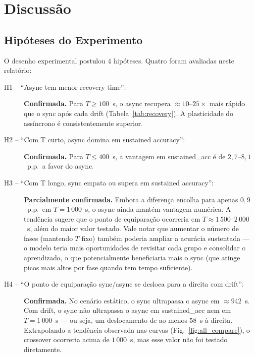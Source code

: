 \documentclass[12pt, a4paper]{article}
\begin{document}
\section{Discussão}

\subsection{Hipóteses do Experimento}

O desenho experimental postulou 4 hipóteses. Quatro foram avaliadas neste
relatório:

\begin{description}
    \item[H1 -- ``Async tem menor recovery time'':] \textbf{Confirmada.}
    Para $T \geq 100$~s, o async recupera $\approx 10$--$25{\times}$ mais
    rápido que o sync após cada drift (Tabela~\ref{tab:recovery}). A
    plasticidade do assíncrono é consistentemente superior.

    \item[H2 -- ``Com T curto, async domina em sustained accuracy'':]
    \textbf{Confirmada.} Para $T \leq 400$~s, a vantagem em sustained\_acc é
    de $2{,}7$--$8{,}1$~p.p.\ a favor do async.

    \item[H3 -- ``Com T longo, sync empata ou supera em sustained accuracy'':]
    \textbf{Parcialmente confirmada.} Embora a diferença encolha para apenas
    $0{,}9$~p.p.\ em $T = 1\,000$~s, o async ainda mantém vantagem numérica.
    A tendência sugere que o ponto de equiparação ocorreria em $T \approx
    1\,500$--$2\,000$~s, além do maior valor testado. Vale notar que aumentar
    o número de fases (mantendo $T$ fixo) também poderia ampliar a acurácia
    sustentada --- o modelo teria mais oportunidades de revisitar cada grupo e
    consolidar o aprendizado, o que potencialmente beneficiaria mais o sync
    (que atinge picos mais altos por fase quando tem tempo suficiente).

    \item[H4 -- ``O ponto de equiparação sync/async se desloca para a direita
    com drift'':] \textbf{Confirmada.} No cenário estático, o sync ultrapassa
    o async em $\approx 942$~s. Com drift, o sync não ultrapassa o async em
    sustained\_acc nem em $T = 1\,000$~s --- ou seja, um deslocamento de ao
    menos $58$~s à direita. Extrapolando a tendência observada nas curvas
    (Fig.~\ref{fig:all_compare}), o crossover ocorreria acima de $1\,000$~s,
    mas esse valor não foi testado diretamente.
\end{description}
\end{document}
